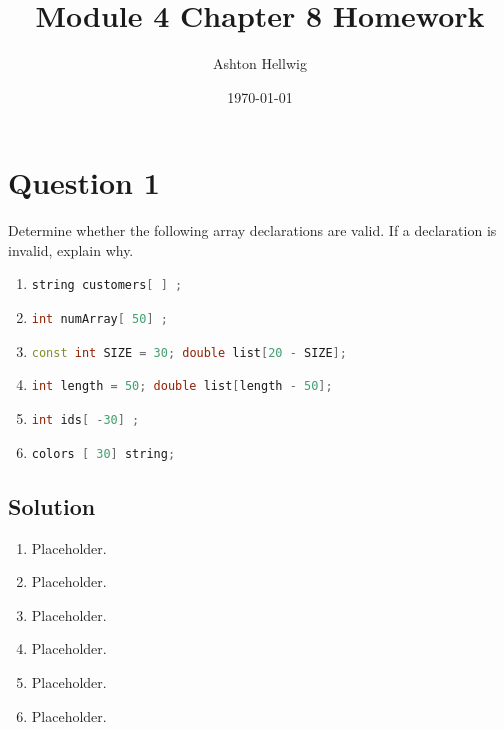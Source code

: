 \documentclass[a4paper, 10pt]{article}
\title{Module 4 Chapter 8 Homework}
\author{Ashton Hellwig}
\date\today
\begin{document}
  \maketitle
  \tableofcontents
  \lstlistoflistings
  \newpage

  \section{Question 1}
    Determine whether the following array declarations are valid. If a
      declaration is invalid, explain why.
    \begin{enumerate}[label=\Alph*.]
      \item \lstinline[language=c++,columns=fixed]{string customers[ ] ;}
      \item \lstinline[language=c++,columns=fixed]{int numArray[ 50] ;}
      \item \lstinline[language=c++,columns=fixed]%
        {const int SIZE = 30; double list[20 - SIZE];}
      \item \lstinline[language=c++,columns=fixed]%
        {int length = 50; double list[length - 50];}
      \item \lstinline[language=c++,columns=fixed]{int ids[ -30] ;}
      \item \lstinline[language=c++,columns=fixed]{colors [ 30] string;}
    \end{enumerate}
    \subsection{Solution}
      \begin{enumerate}[label=\alph*.]
        \item Placeholder.
        \item Placeholder.
        \item Placeholder.
        \item Placeholder.
        \item Placeholder.
        \item Placeholder.
      \end{enumerate}


\end{document}

